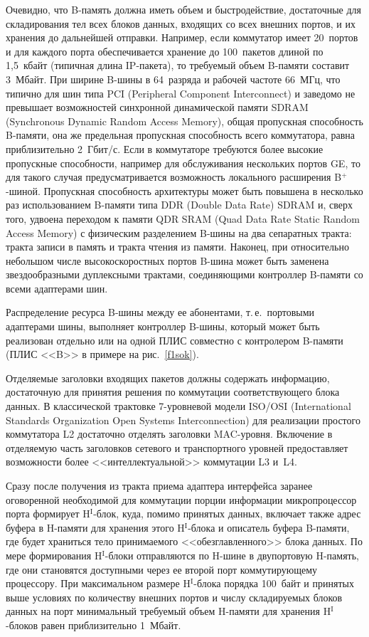 \begin{multicols}{2}
    Очевидно, что B-память должна иметь объем и быстродействие, достаточные для
складирования тел всех блоков данных, входящих со всех внешних портов, и их хранения до
дальнейшей отправки. Например, если коммутатор имеет 20~портов и для каждого порта
обеспечивается хранение до 100~пакетов длиной по 1,5~кбайт (типичная длина IP-па\-ке\-та), то
требуемый объем B-памяти составит 3~Мбайт. При ширине B-шины в 64~разряда и рабочей
частоте 66~МГц, что типично для шин типа PCI (Peripheral Component Interconnect)
  и заведомо не превышает возможностей
синхронной динамической памяти SDRAM (Synchronous Dynamic Random Access Memory), 
общая пропускная способность B-па\-мя\-ти, она же
предельная пропускная способность всего коммутатора, равна приблизительно 2~Гбит/с. Если в
коммутаторе требуются более высокие пропускные способности, например для обслуживания
нескольких портов GE, то для такого случая предусматривается возможность локального
расширения B$^+$-ши\-ной. Пропускная способность архитектуры может быть повышена в
несколько раз использованием B-па\-мя\-ти типа DDR (Double Data Rate)
SDRAM и, сверх того, удвоена переходом к
памяти QDR SRAM (Quad Data Rate Static Random
Access Memory)
с физическим разделением B-шины на два сепаратных тракта: тракта
записи в память и тракта чтения из памяти. Наконец, при относительно небольшом числе
высокоскоростных портов B-шина может быть заменена звездообразными дуплексными
трактами, соединяющими контроллер B-памяти со всеми адаптерами шин.

    Распределение ресурса B-шины между ее абонентами, т.\,е.\ портовыми адаптерами
шины, выполняет контроллер B-шины, который может быть реализован отдельно или на одной
ПЛИС совместно с контролером B-памяти (ПЛИС <<B>> в примере на рис.~\ref{f1sok}).

    Отделяемые заголовки входящих пакетов должны содержать информацию, достаточную
для принятия решения по коммутации со\-от\-вет\-ст\-ву\-юще\-го блока данных. В классической
трактовке 7-уров\-не\-вой модели ISO/OSI (International Standards Organization Open Systems
Interconnection)
для реализации простого коммутатора L2 достаточно
отделять заголовки MAC-уров\-ня. Включение в отделяемую часть заголовков сетевого и
транспортного уровней предо\-став\-ля\-ет возможности более <<интеллектуальной>> коммутации
L3 и~L4.

    Сразу после получения из тракта приема адаптера интерфейса заранее оговоренной
необходимой для коммутации порции информации микропроцессор порта формирует
H$^{\mathrm{I}}$-блок, куда, помимо принятых данных, включает также адрес буфера в H-памяти для
хранения этого H$^{\mathrm{I}}$-блока и описатель буфера B-памяти, где будет храниться тело
принимаемого <<обезглавленного>> блока данных. По мере формирования H$^{\mathrm{I}}$-блоки
отправляются по H-шине в двупортовую H-память, где они становятся доступными через ее
второй порт коммутирующему процессору. При максимальном размере H$^{\mathrm{I}}$-блока порядка
100~байт и принятых выше условиях по количеству внешних портов и числу складируемых
блоков данных на порт минимальный требуемый объем H-памяти для хранения H$^{\mathrm{I}}$-блоков
равен приблизительно 1~Мбайт.


\end{multicols}
